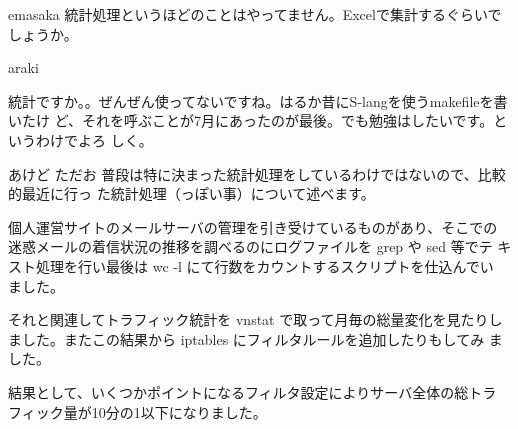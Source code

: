 \begin{prework}{emasaka}
統計処理というほどのことはやってません。Excelで集計するぐらいでしょうか。
\end{prework}

\begin{prework}{araki}

統計ですか。。ぜんぜん使ってないですね。はるか昔にS-langを使うmakefileを書いたけ
ど、それを呼ぶことが7月にあったのが最後。でも勉強はしたいです。というわけでよろ
しく。

\end{prework}

\begin{prework}{あけど ただお}
 普段は特に決まった統計処理をしているわけではないので、比較的最近に行っ
 た統計処理（っぽい事）について述べます。

 個人運営サイトのメールサーバの管理を引き受けているものがあり、そこでの
 迷惑メールの着信状況の推移を調べるのにログファイルを grep や sed 等でテ
 キスト処理を行い最後は wc -l にて行数をカウントするスクリプトを仕込んでい
 ました。

 それと関連してトラフィック統計を vnstat で取って月毎の総量変化を見たりし
 ました。またこの結果から iptables にフィルタルールを追加したりもしてみ
 ました。

 結果として、いくつかポイントになるフィルタ設定によりサーバ全体の総トラ
 フィック量が10分の1以下になりました。
\end{prework}
